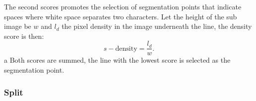 	The second scores promotes the selection of segmentation points that indicate spaces where white space separates two characters. Let the height of the sub image be $w$ and $l_d$ the pixel density in the image underneath the line, the density score is then:
		\begin{equation}
			s-{\text{density}} = \frac{l_d}{w}.
		\end{equation}a
	Both scores are summed, the line with the lowest score is selected as the segmentation point.

\subsubsection{Split}
\label{sss:method:segmentaton:splitimage}

	\begin{figure}
		\centering
		

\end{figure}
